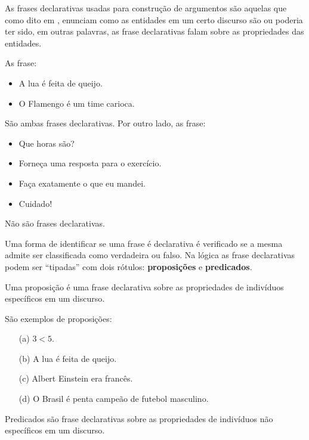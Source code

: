 As frases declarativas usadas para construção de argumentos são aquelas que como dito em \cite{joaoPavao2014}, enunciam como as entidades em um certo discurso são ou poderia ter sido, em outras palavras, as frase declarativas falam sobre as propriedades das entidades.

\begin{exemplo}\label{exe:FrasesDeclarativas}
	As frase:
	\begin{itemize}
		\item A lua é feita de queijo.
		\item O Flamengo é um time carioca.
	\end{itemize}
	São ambas frases declarativas. Por outro lado, as frase:
	\begin{itemize}
		\item Que horas são?
		\item Forneça uma resposta para o exercício.
		\item Faça exatamente o que eu mandei.
		\item Cuidado!
	\end{itemize}
	Não são frases declarativas.
\end{exemplo}

Uma forma de identificar se uma frase é declarativa é verificado se a mesma admite ser classificada como verdadeira ou falso.  Na lógica as frase declarativas podem ser ``tipadas'' com dois rótulos: \textbf{proposições} e \textbf{predicados}. 

\begin{definicao}[Proposição]\label{def:Proposicao}
	Uma proposição é uma frase declarativa sobre as propriedades de indivíduos específicos em um discurso.
\end{definicao}

\begin{exemplo}\label{exe:Proposicoes}
	São exemplos de proposições:
	\begin{itemize}
		\item[(a)] $3 < 5$.
		\item[(b)] A lua é feita de queijo.
		\item[(c)] Albert Einstein era francês.
		\item[(d)] O Brasil é penta campeão de futebol masculino.
	\end{itemize}
\end{exemplo}

\begin{definicao}[Predicados]\label{def:Predicados}
	Predicados são frase declarativas sobre as propriedades de indivíduos não específicos em um discurso.
\end{definicao}

